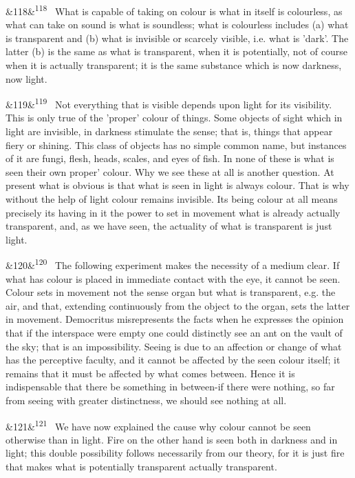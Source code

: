 \documentclass[12pt]{article}
\newcommand{\para}[1][]{\par\noindent\ifx&#1&\else\textsuperscript{\footnotesize #1}~\fi}
\begin{document}
\para[118] What is capable of taking on colour is what in itself is colourless, as what can take on sound is what is soundless; what is colourless includes (a) what is transparent and (b) what is invisible or scarcely visible, i.e. what is 'dark'. The latter (b) is the same as what is transparent, when it is potentially, not of course when it is actually transparent; it is the same substance which is now darkness, now light.

\para[119] Not everything that is visible depends upon light for its visibility. This is only true of the 'proper' colour of things. Some objects of sight which in light are invisible, in darkness stimulate the sense; that is, things that appear fiery or shining. This class of objects has no simple common name, but instances of it are fungi, flesh, heads, scales, and eyes of fish. In none of these is what is seen their own proper' colour. Why we see these at all is another question. At present what is obvious is that what is seen in light is always colour. That is why without the help of light colour remains invisible. Its being colour at all means precisely its having in it the power to set in movement what is already actually transparent, and, as we have seen, the actuality of what is transparent is just light.

\para[120] The following experiment makes the necessity of a medium clear. If what has colour is placed in immediate contact with the eye, it cannot be seen. Colour sets in movement not the sense organ but what is transparent, e.g. the air, and that, extending continuously from the object to the organ, sets the latter in movement. Democritus misrepresents the facts when he expresses the opinion that if the interspace were empty one could distinctly see an ant on the vault of the sky; that is an impossibility. Seeing is due to an affection or change of what has the perceptive faculty, and it cannot be affected by the seen colour itself; it remains that it must be affected by what comes between. Hence it is indispensable that there be something in between-if there were nothing, so far from seeing with greater distinctness, we should see nothing at all.

\para[121] We have now explained the cause why colour cannot be seen otherwise than in light. Fire on the other hand is seen both in darkness and in light; this double possibility follows necessarily from our theory, for it is just fire that makes what is potentially transparent actually transparent.
\end{document}
